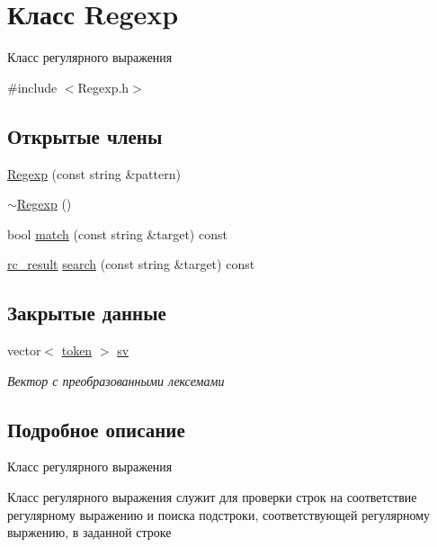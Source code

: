 \hypertarget{class_regexp}{}\section{Класс Regexp}
\label{class_regexp}


Класс регулярного выражения  




{\ttfamily \#include $<$Regexp.\+h$>$}

\subsection*{Открытые члены}
\begin{DoxyCompactItemize}
\item 
\hyperlink{class_regexp_abde3553b9033fd74f944dba8cdb6b9ea}{Regexp} (const string \&pattern)
\item 
\hyperlink{class_regexp_ada3dfc1370864a39089592fbe27ef19d}{$\sim$\+Regexp} ()
\item 
bool \hyperlink{class_regexp_a7869806d5707d47742db7ad5129b6585}{match} (const string \&target) const 
\item 
\hyperlink{structrc__result}{rc\+\_\+result} \hyperlink{class_regexp_af7c296f94f7577ce0fa662c78268659e}{search} (const string \&target) const 
\end{DoxyCompactItemize}
\subsection*{Закрытые данные}
\begin{DoxyCompactItemize}
\item 
vector$<$ \hyperlink{structtoken}{token} $>$ \hyperlink{class_regexp_a784da1e5f4f040a16734c9e3dee089a5}{sv}
\begin{DoxyCompactList}\small\item\em Вектор с преобразованными лексемами \end{DoxyCompactList}\end{DoxyCompactItemize}


\subsection{Подробное описание}
Класс регулярного выражения 

Класс регулярного выражения служит для проверки строк на соответствие регулярному выражению и поиска подстроки, соответствующей регулярному выржению, в заданной строке 


